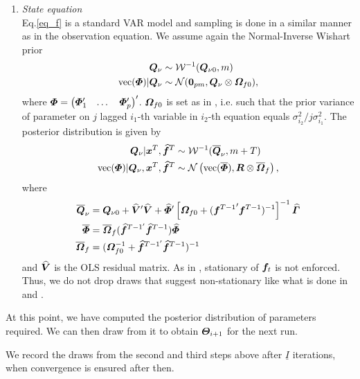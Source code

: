 \begin{enumerate}
\begin{enumerate}
\item
\textit{State equation}\\
Eq.\eqref{eq_f} is a standard VAR model and sampling is done in a similar manner as in the observation equation. We assume again the Normal-Inverse Wishart prior
\begin{align}
	\bm Q_\nu&\sim\mathcal{W}^{-1}(\bm Q_{\nu0},m)\\
	\operatorname{vec}(\bm \varPhi)|\bm Q_\nu&\sim\mathcal{N}(\boldsymbol{0}_{pm},\bm Q_\nu\otimes\bm \varOmega_{f0}),
\end{align}
where
$\bm \varPhi=
	\begin{pmatrix}
		\bm \varPhi_1'&\dots&\bm \varPhi_p'
	\end{pmatrix}'$.
$\bm \varOmega_{f0}$ is set as in \cite{FAVAR}, i.e. such that the prior variance of parameter on $j$ lagged $i_1$-th variable in $i_2$-th equation equals $\sigma_{i_2}^2/j\sigma_{i_1}^2$. The posterior distribution is given by
\begin{align}
	\bm Q_\nu|\bm x^T,\widehat{\bm f}^T&\sim\mathcal{W}^{-1}(\overline{\bm Q}_\nu,m+T)\\
	\operatorname{vec}(\bm \varPhi)|\bm Q_\nu,\bm x^T,\widehat{\bm f}^T&\sim\mathcal{N}\left(\operatorname{vec}(\overline{\bm \varPhi}),\bm R\otimes\overline{\bm \varOmega}_f\right),
\end{align}
where
\begin{align}
	\overline{\bm Q}_\nu&=\bm Q_{\nu0}+\widehat{\bm V}'\widehat{\bm V}+\widehat{\bm \varPhi}'\left[\bm \varOmega_{f0}+({\bm f^{T-1}}'\bm f^{T-1})^{-1}\right]^{-1}\widehat{\bm \varGamma}\\
	\overline{\bm \varPhi}&=\overline{\bm \varOmega}_f(\widehat{\bm f}^{T-1'}\widehat{\bm f}^{T-1})\widehat{\bm \varPhi}\\
	\overline{\bm \varOmega}_f&=(\bm \varOmega_{f0}^{-1}+\widehat{\bm f}^{T-1'}\widehat{\bm f}^{T-1})^{-1}
\end{align}
and $\widehat{\bm V}$ is the OLS residual matrix. As in \cite{CCE15}, stationary of $\bm f_t$ is not enforced. Thus, we do not drop draws that suggest non-stationary like what is done in \cite{FAVAR} and \cite{FAVAR_sign}.
\end{enumerate}
At this point, we have computed the posterior distribution of parameters required. We can then draw from it to obtain $\bm \varTheta_{i+1}$ for the next run.
\end{enumerate}
We record the draws from the second and third steps above after $\underline I$ iterations, when convergence is ensured after then.